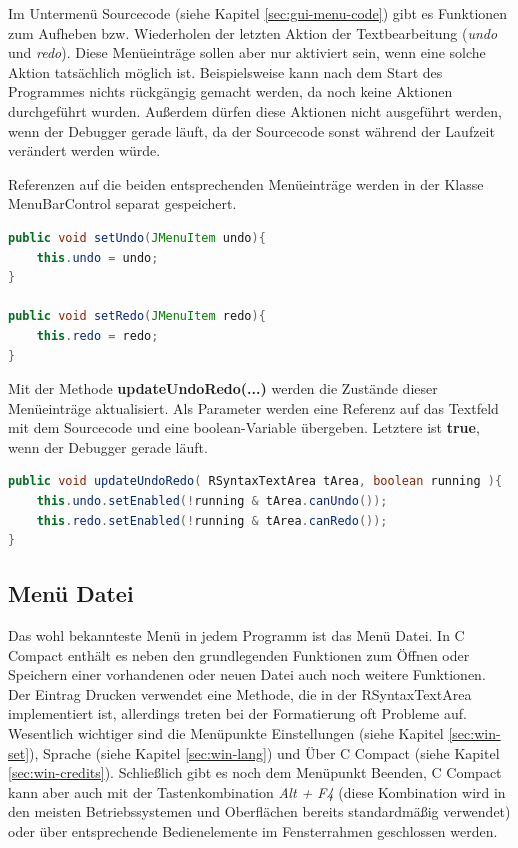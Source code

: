 Im Untermenü \glqq{}Sourcecode\grqq{} (siehe Kapitel \ref{sec:gui-menu-code}) gibt es Funktionen zum Aufheben bzw. Wiederholen der letzten Aktion der Textbearbeitung (\emph{undo} und \emph{redo}). Diese Menüeinträge sollen aber nur aktiviert sein, wenn eine solche Aktion tatsächlich möglich ist. Beispielsweise kann nach dem Start des Programmes nichts rückgängig gemacht werden, da noch keine Aktionen durchgeführt wurden. Außerdem dürfen diese Aktionen nicht ausgeführt werden, wenn der Debugger gerade läuft, da der Sourcecode sonst während der Laufzeit verändert werden würde.

Referenzen auf die beiden entsprechenden Menüeinträge werden in der Klasse MenuBarControl separat gespeichert.
\begin{lstlisting}[language=JAVA]
public void setUndo(JMenuItem undo){
	this.undo = undo;
}

public void setRedo(JMenuItem redo){
	this.redo = redo;
}
\end{lstlisting}

Mit der Methode \textbf{updateUndoRedo(...)} werden die Zustände dieser Menüeinträge aktualisiert. Als Parameter werden eine Referenz auf das Textfeld mit dem Sourcecode und eine boolean-Variable übergeben. Letztere ist \textbf{true}, wenn der Debugger gerade läuft.
\begin{lstlisting}[language=JAVA]
public void updateUndoRedo( RSyntaxTextArea tArea, boolean running ){
	this.undo.setEnabled(!running & tArea.canUndo());
	this.redo.setEnabled(!running & tArea.canRedo());
}
\end{lstlisting}

\subsection{Menü \glqq{}Datei\grqq{}}
\label{sec:gui-main-menu-file}
Das wohl bekannteste Menü in jedem Programm ist das Menü \glqq{}Datei\grqq{}. In C Compact enthält es neben den grundlegenden Funktionen zum Öffnen oder Speichern einer vorhandenen oder neuen Datei auch noch weitere Funktionen. Der Eintrag \glqq{}Drucken\grqq{} verwendet eine Methode, die in der RSyntaxTextArea implementiert ist, allerdings treten bei der Formatierung oft Probleme auf. Wesentlich wichtiger sind die Menüpunkte \glqq{}Einstellungen\grqq{} (siehe Kapitel \ref{sec:win-set}), \glqq{}Sprache\grqq{} (siehe Kapitel \ref{sec:win-lang}) und \glqq{}Über C Compact\grqq{} (siehe Kapitel \ref{sec:win-credits}). Schließlich gibt es noch dem Menüpunkt \glqq{}Beenden\grqq{}, C Compact kann aber auch mit der Tastenkombination \emph{Alt + F4} (diese Kombination wird in den meisten Betriebssystemen und Oberflächen bereits standardmäßig verwendet) oder über entsprechende Bedienelemente im Fensterrahmen geschlossen werden.

